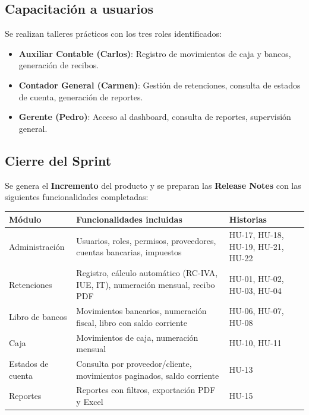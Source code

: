 \documentclass[stu]{apa7}
\begin{document}
\subsection{Capacitación a usuarios}

Se realizan talleres prácticos con los tres roles identificados:

\begin{itemize}
    \item \textbf{Auxiliar Contable (Carlos)}: Registro de movimientos de caja y bancos, generación de recibos.
    \item \textbf{Contador General (Carmen)}: Gestión de retenciones, consulta de estados de cuenta, generación de reportes.
    \item \textbf{Gerente (Pedro)}: Acceso al dashboard, consulta de reportes, supervisión general.
\end{itemize}

\subsection{Cierre del Sprint}

Se genera el \textbf{Incremento} del producto y se preparan las \textbf{Release Notes} con las siguientes funcionalidades completadas:

\begin{longtable}{|L{3cm}|L{5cm}|L{4cm}|}
\hline
{}
\textbf{Módulo} & \textbf{Funcionalidades incluidas} & \textbf{Historias} \\
\hline
Administración & Usuarios, roles, permisos, proveedores, cuentas bancarias, impuestos & HU-17, HU-18, HU-19, HU-21, HU-22 \\
\hline
Retenciones & Registro, cálculo automático (RC-IVA, IUE, IT), numeración mensual, recibo PDF & HU-01, HU-02, HU-03, HU-04 \\
\hline
Libro de bancos & Movimientos bancarios, numeración fiscal, libro con saldo corriente & HU-06, HU-07, HU-08 \\
\hline
Caja & Movimientos de caja, numeración mensual & HU-10, HU-11 \\
\hline
Estados de cuenta & Consulta por proveedor/cliente, movimientos paginados, saldo corriente & HU-13 \\
\hline
Reportes & Reportes con filtros, exportación PDF y Excel & HU-15 \\
\hline
\end{longtable}

\newpage
\end{document}
